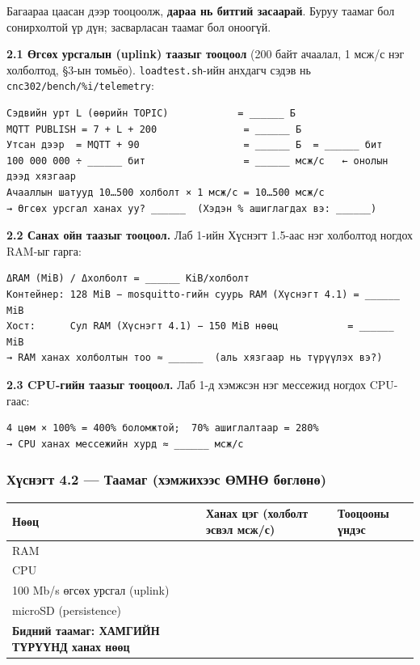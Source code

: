 Багаараа цаасан дээр тооцоолж, \textbf{дараа нь битгий засаарай}. Буруу таамаг бол сонирхолтой үр дүн; засварласан таамаг бол оноогүй.

\textbf{2.1 Өгсөх урсгалын (uplink) таазыг тооцоол} (200 байт ачаалал, 1 мсж/с нэг холболтод, §3-ын томьёо). \texttt{loadtest.sh}-ийн анхдагч сэдэв нь \texttt{cnc302/\allowbreak{}bench/\allowbreak{}\%i/\allowbreak{}telemetry}:

\begin{verbatim}
Сэдвийн урт L (өөрийн TOPIC)            = ______ Б
MQTT PUBLISH = 7 + L + 200               = ______ Б
Утсан дээр  = MQTT + 90                  = ______ Б  = ______ бит
100 000 000 ÷ ______ бит                 = ______ мсж/с   ← онолын дээд хязгаар
Ачааллын шатууд 10…500 холболт × 1 мсж/с = 10…500 мсж/с
→ Өгсөх урсгал ханах уу? ______  (Хэдэн % ашиглагдах вэ: ______)
\end{verbatim}

\textbf{2.2 Санах ойн таазыг тооцоол.} Лаб 1-ийн Хүснэгт 1.5-аас нэг холболтод ногдох RAM-ыг гарга:

\begin{verbatim}
ΔRAM (MiB) / Δхолболт = ______ KiB/холболт
Контейнер: 128 MiB − mosquitto-гийн суурь RAM (Хүснэгт 4.1) = ______ MiB
Хост:      Сул RAM (Хүснэгт 4.1) − 150 MiB нөөц            = ______ MiB
→ RAM ханах холболтын тоо ≈ ______  (аль хязгаар нь түрүүлэх вэ?)
\end{verbatim}

\textbf{2.3 CPU-гийн таазыг тооцоол.} Лаб 1-д хэмжсэн нэг мессежид ногдох CPU-гаас:

\begin{verbatim}
4 цөм × 100% = 400% боломжтой;  70% ашиглалтаар = 280%
→ CPU ханах мессежийн хурд ≈ ______ мсж/с
\end{verbatim}

\hypertarget{ux445ux4afux441ux43dux44dux433ux442-4.2-ux442ux430ux430ux43cux430ux433-ux445ux44dux43cux436ux438ux445ux44dux44dux441-ux4e9ux43cux43dux4e9-ux431ux4e9ux433ux43bux4e9ux43dux4e9}{%
\subsubsection{Хүснэгт 4.2 --- Таамаг (хэмжихээс ӨМНӨ бөглөнө)}\label{ux445ux4afux441ux43dux44dux433ux442-4.2-ux442ux430ux430ux43cux430ux433-ux445ux44dux43cux436ux438ux445ux44dux44dux441-ux4e9ux43cux43dux4e9-ux431ux4e9ux433ux43bux4e9ux43dux4e9}}

\begingroup\scriptsize\begin{longtable}[]{@{}lll@{}}
\toprule
Нөөц & Ханах цэг (холболт эсвэл мсж/с) & Тооцооны үндэс\tabularnewline
\midrule
\endhead
RAM & &\tabularnewline
CPU & &\tabularnewline
100 Mb/s өгсөх урсгал (uplink) & &\tabularnewline
microSD (persistence) & &\tabularnewline
\textbf{Бидний таамаг: ХАМГИЙН ТҮРҮҮНД ханах нөөц} & &\tabularnewline
\bottomrule
\end{longtable}\endgroup

